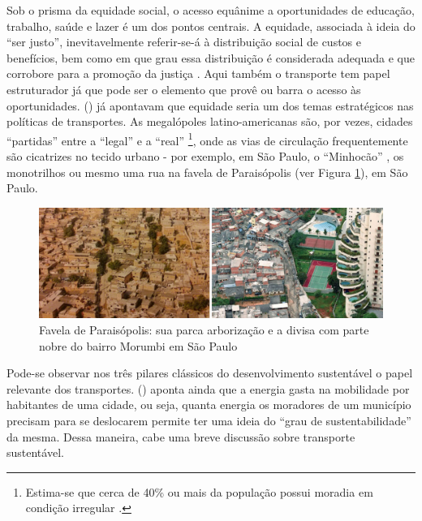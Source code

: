 Sob o prisma da equidade social, o acesso equânime a oportunidades de educação, trabalho, saúde e lazer é um dos pontos centrais. A equidade, associada à ideia do ``ser justo'', inevitavelmente referir-se-á à distribuição social de custos e benefícios, bem como em que grau essa distribuição é considerada adequada e que corrobore para a promoção da justiça \cite{LITMAN2006}. Aqui também o transporte tem papel estruturador já que pode ser o elemento que provê ou barra o acesso às oportunidades.  (\citeyear{SANCHEZ2003}) já apontavam que equidade seria um dos temas estratégicos nas políticas de transportes. As megalópoles latino-americanas são, por vezes, cidades ``partidas'' \cite{VENTURA2001} entre a ``legal'' e a ``real'' \cite{ALVA1997}%
\footnote{Estima-se que cerca de 40\% ou mais da população possui moradia em condição irregular \cite{FREITAG2007}.},
onde as vias de circulação frequentemente são cicatrizes no tecido urbano - por exemplo, em São Paulo, o ``Minhocão'' \cite{ABASCAL2010}, os monotrilhos \cite{ROLNIK2010} ou mesmo uma rua na favela de Paraisópolis (ver Figura \ref{fig:paraisopolis}), em São Paulo.

\begin{figure}[htb]%
    \caption{\label{fig:paraisopolis}Favela de Paraisópolis: sua parca arborização e a divisa com parte nobre do bairro Morumbi em São Paulo}%
    \begin{center}%
        \includegraphics[width=1.0\textwidth]{./imagens/paraisopolis.jpg}%
    \end{center}%
\end{figure}%

Pode-se observar nos três pilares clássicos do desenvolvimento sustentável o papel relevante dos transportes.  (\citeyear{VASCONCELLOS2012}) aponta ainda que a energia gasta na mobilidade por habitantes de uma cidade, ou seja, quanta energia os moradores de um município precisam para se deslocarem permite ter uma ideia do ``grau de sustentabilidade'' da mesma. Dessa maneira, cabe uma breve discussão sobre transporte sustentável.

